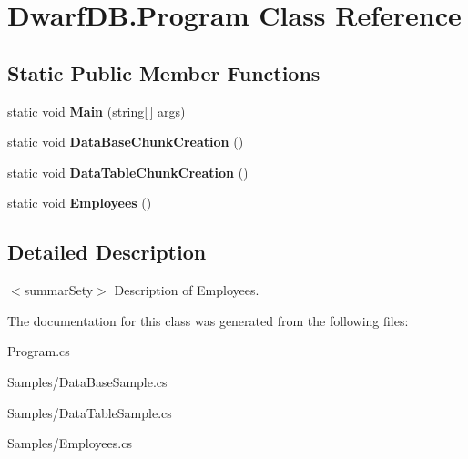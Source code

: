 \hypertarget{class_dwarf_d_b_1_1_program}{
\section{DwarfDB.Program Class Reference}
\label{class_dwarf_d_b_1_1_program}
}
\subsection*{Static Public Member Functions}
\begin{DoxyCompactItemize}
\item 
\hypertarget{class_dwarf_d_b_1_1_program_ad191792c625399b2912062074ad4476b}{
static void {\bfseries Main} (string\mbox{[}$\,$\mbox{]} args)}
\label{class_dwarf_d_b_1_1_program_ad191792c625399b2912062074ad4476b}

\item 
\hypertarget{class_dwarf_d_b_1_1_program_af6bc5554955f41aa161cd638dd1fcbc1}{
static void {\bfseries DataBaseChunkCreation} ()}
\label{class_dwarf_d_b_1_1_program_af6bc5554955f41aa161cd638dd1fcbc1}

\item 
\hypertarget{class_dwarf_d_b_1_1_program_abab621dfeced1fb0c770bd5a1dffe3a6}{
static void {\bfseries DataTableChunkCreation} ()}
\label{class_dwarf_d_b_1_1_program_abab621dfeced1fb0c770bd5a1dffe3a6}

\item 
\hypertarget{class_dwarf_d_b_1_1_program_a59b46f2c792386b7eaaf5419cd7656a0}{
static void {\bfseries Employees} ()}
\label{class_dwarf_d_b_1_1_program_a59b46f2c792386b7eaaf5419cd7656a0}

\end{DoxyCompactItemize}


\subsection{Detailed Description}
$<$summarSety$>$ Description of Employees. 

The documentation for this class was generated from the following files:\begin{DoxyCompactItemize}
\item 
Program.cs\item 
Samples/DataBaseSample.cs\item 
Samples/DataTableSample.cs\item 
Samples/Employees.cs\end{DoxyCompactItemize}
